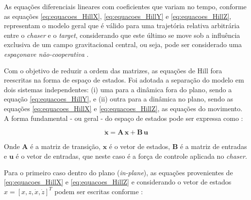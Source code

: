 As equações diferenciais lineares com coeficientes que variam no tempo, conforme as equações \eqref{eq:equacoes_HillX}, \eqref{eq:equacoes_HillY} e \eqref{eq:equacoes_HillZ}, representam o modelo geral que é válido para uma trajetória relativa arbitrária \cite{debruijn2011,ortolano2017} entre o \emph{chaser} e o \emph{target}, considerando que este último se move sob a influência exclusiva de um campo gravitacional central, ou seja, pode ser considerado uma \emph{espaçonave não-cooperativa} \cite{mahendrakar2023}.

Com o objetivo de reduzir a ordem das matrizes, as equações de Hill fora reescritas na forma de espaço de estados. Foi adotada a separação do modelo em dois sistemas independentes: (i) uma para a dinâmica fora do plano, sendo a equação \eqref{eq:equacoes_HillY}, e (ii) outra para a dinâmica no plano, sendo as equações \eqref{eq:equacoes_HillX} e \eqref{eq:equacoes_HillZ}, as equações do movimento. A forma fundamental - ou geral - do espaço de estados pode ser expressa como \cite{fehse2003,starek2016,sherrill2014}:

\begin{equation}
    \dot{\mathbf{x}} = \mathbf{A}\,\mathbf{x} + \mathbf{B}\,\mathbf{u}
    \label{eq:state_space_general}
\end{equation}

Onde $\mathbf{A}$ é a matriz de transição, $\mathbf{x}$ é o vetor de estados, $\mathbf{B}$ é a matriz de entradas e $\mathbf{u}$ é o vetor de entradas, que neste caso é a força de controle aplicada no \emph{chaser}.

Para o primeiro caso dentro do plano (\textit{in-plane}), as equações provenientes de \eqref{eq:equacoes_HillX} e \eqref{eq:equacoes_HillZ} e considerando o vetor de estados $x = [x,z, \dot{x}, \dot{z}]^T$ podem ser escritas conforme \cite{fehse2003}:

